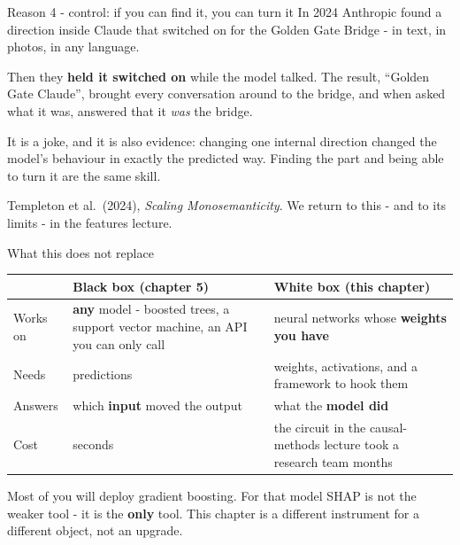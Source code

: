 \documentclass[aspectratio=169]{beamer}
\newcommand{\keybox}[1]{%
  \begin{tcolorbox}[colback=armblue!8, colframe=armblue, boxrule=0.6pt, arc=2pt]
  #1
  \end{tcolorbox}}
\newcommand{\watchbox}[1]{%
  \begin{tcolorbox}[colback=armorange!12, colframe=armorange, boxrule=0.6pt, arc=2pt]
  #1
  \end{tcolorbox}}
\begin{document}
\begin{frame}{Reason 4 - control: if you can find it, you can turn it}
  \vspace{0.6em}
  In 2024 Anthropic found a direction inside Claude that switched on for the Golden Gate Bridge -
  in text, in photos, in any language.

  \vspace{0.7em}
  Then they \textbf{held it switched on} while the model talked. The result, ``Golden Gate
  Claude'', brought every conversation around to the bridge, and when asked what it was,
  answered that it \emph{was} the bridge.

  \vspace{0.9em}
  \keybox{It is a joke, and it is also evidence: changing one internal direction changed the model's
  behaviour in exactly the predicted way. Finding the part and being able to turn it are the same
  skill.}

  \vspace{0.4em}
  {\footnotesize Templeton et al.\ (2024), \emph{Scaling Monosemanticity}. We return to this -
  and to its limits - in the features lecture.}
\end{frame}

\begin{frame}{What this does not replace}
  \vspace{0.4em}
  \begin{center}
  \small
  \begin{tabular}{@{}>{\raggedright\arraybackslash}p{}>{\raggedright\arraybackslash}p{}>{\raggedright\arraybackslash}p{}@{}}
    \toprule
    & \textbf{Black box} (chapter 5) & \textbf{White box} (this chapter)\\
    \midrule
    Works on & \textbf{any} model - boosted trees, a support vector machine, an API you can
      only call & neural networks whose \textbf{weights you have}\\[0.1em]
    Needs & predictions & weights, activations, and a framework to hook them\\[0.1em]
    Answers & which \textbf{input} moved the output & what the \textbf{model did}\\[0.1em]
    Cost & seconds & the circuit in the causal-methods lecture took a research team months\\
    \bottomrule
  \end{tabular}
  \end{center}

  \vspace{0.2em}
  \watchbox{Most of you will deploy gradient boosting. For that model SHAP is not the weaker
  tool - it is the \textbf{only} tool. This chapter is a different instrument for a different
  object, not an upgrade.}
\end{frame}
\end{document}
